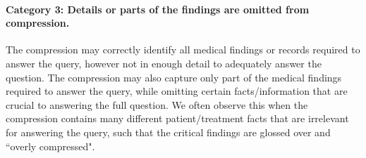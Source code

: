 \documentclass{article} %
\begin{document}
\paragraph*{Category 3: Details or parts of the findings are omitted from compression.} 
The compression may correctly identify all medical findings or records required to answer the query, however not in enough detail to adequately answer the question. The compression may also capture only part of the medical findings required to answer the query, while omitting certain facts/information that are crucial to answering the full question. We often observe this when the compression contains many different patient/treatment facts that are irrelevant for answering the query, such that the critical findings are glossed over and ``overly compressed".
\end{document}
